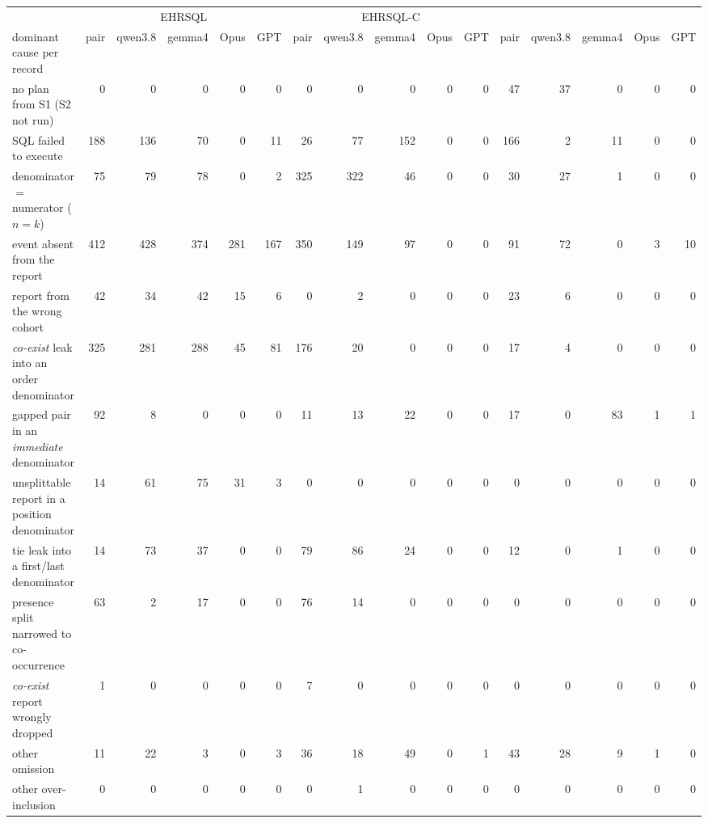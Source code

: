 \begin{table}[tp]
\centering
\scriptsize
\setlength{\tabcolsep}{3pt}
\renewcommand{\arraystretch}{1.05}
\begin{tabular}{@{}lrrrrrrrrrrrrrrr@{}}
\toprule
 & \multicolumn{5}{c}{EHRSQL} & \multicolumn{5}{c}{EHRSQL-C} & \multicolumn{5}{c}{\art{}} \\
\cmidrule(lr){2-6}\cmidrule(lr){7-11}\cmidrule(lr){12-16}
dominant cause per record & pair & qwen3.8 & gemma4 & Opus & GPT & pair & qwen3.8 & gemma4 & Opus & GPT & pair & qwen3.8 & gemma4 & Opus & GPT \\
\midrule
no plan from S1 (S2 not run) & 0 & 0 & 0 & 0 & 0 & 0 & 0 & 0 & 0 & 0 & 47 & 37 & 0 & 0 & 0 \\
SQL failed to execute & 188 & 136 & 70 & 0 & 11 & 26 & 77 & 152 & 0 & 0 & 166 & 2 & 11 & 0 & 0 \\
denominator $=$ numerator ($n = k$) & 75 & 79 & 78 & 0 & 2 & 325 & 322 & 46 & 0 & 0 & 30 & 27 & 1 & 0 & 0 \\
event absent from the report & 412 & 428 & 374 & 281 & 167 & 350 & 149 & 97 & 0 & 0 & 91 & 72 & 0 & 3 & 10 \\
report from the wrong cohort & 42 & 34 & 42 & 15 & 6 & 0 & 2 & 0 & 0 & 0 & 23 & 6 & 0 & 0 & 0 \\
\emph{co-exist} leak into an order denominator & 325 & 281 & 288 & 45 & 81 & 176 & 20 & 0 & 0 & 0 & 17 & 4 & 0 & 0 & 0 \\
gapped pair in an \emph{immediate} denominator & 92 & 8 & 0 & 0 & 0 & 11 & 13 & 22 & 0 & 0 & 17 & 0 & 83 & 1 & 1 \\
unsplittable report in a position denominator & 14 & 61 & 75 & 31 & 3 & 0 & 0 & 0 & 0 & 0 & 0 & 0 & 0 & 0 & 0 \\
tie leak into a first/last denominator & 14 & 73 & 37 & 0 & 0 & 79 & 86 & 24 & 0 & 0 & 12 & 0 & 1 & 0 & 0 \\
presence split narrowed to co-occurrence & 63 & 2 & 17 & 0 & 0 & 76 & 14 & 0 & 0 & 0 & 0 & 0 & 0 & 0 & 0 \\
\emph{co-exist} report wrongly dropped & 1 & 0 & 0 & 0 & 0 & 7 & 0 & 0 & 0 & 0 & 0 & 0 & 0 & 0 & 0 \\
other omission & 11 & 22 & 3 & 0 & 3 & 36 & 18 & 49 & 0 & 1 & 43 & 28 & 9 & 1 & 0 \\
other over-inclusion & 0 & 0 & 0 & 0 & 0 & 0 & 1 & 0 & 0 & 0 & 0 & 0 & 0 & 0 & 0 \\

\end{tabular}
\end{table}
